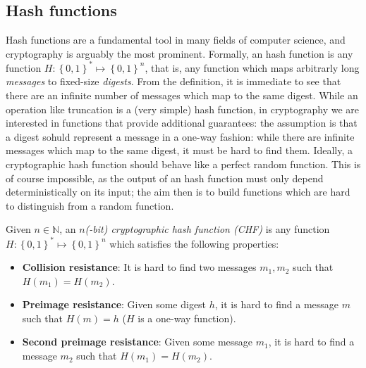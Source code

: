 \subsection{Hash functions}
Hash functions are a fundamental tool in many fields of computer science, and cryptography is
arguably the most prominent.
Formally, an hash function is any function \(H\colon {\left\{0, 1\right\}}^{*} \mapsto
{\left\{0, 1\right\}}^n\), that is, any function which maps arbitrarly long \emph{messages} to
fixed-size \emph{digests}.
From the definition, it is immediate to see that there are an infinite number of messages which map
to the same digest.
While an operation like truncation is a (very simple) hash function, in cryptography we are
interested in functions that provide additional guarantees: the assumption is that a digest sohuld
represent a message in a one-way fashion: while there are infinite messages which map to the same
digest, it must be hard to find them.
Ideally, a cryptographic hash function should behave like a perfect random function.
This is of course impossible, as the output of an hash function must only depend deterministically
on its input; the aim then is to build functions which are hard to distinguish from a random
function.
\begin{definition}
	Given \(n \in \mathbb{N}\), an \emph{\(n\)(-bit) cryptographic hash function (CHF)} is any
	function \(H\colon {\left\{0, 1\right\}}^{*} \mapsto {\left\{0, 1\right\}}^n\) which satisfies
	the following properties:
	\begin{itemize}
		\item \textbf{Collision resistance}: It is hard to find two messages \(m_1, m_2\) such
		      that \(H\left(m_1\right) = H\left(m_2\right)\).
		\item \textbf{Preimage resistance}: Given some digest \(h\), it is hard to find a
		      message \(m\) such that \(H\left(m\right) = h\) (\(H\) is a one-way function).
		\item \textbf{Second preimage resistance}: Given some message \(m_1\), it is hard to
		      find a message \(m_2\) such that \(H\left(m_1\right) = H\left(m_2\right)\).
	\end{itemize}
\end{definition}

